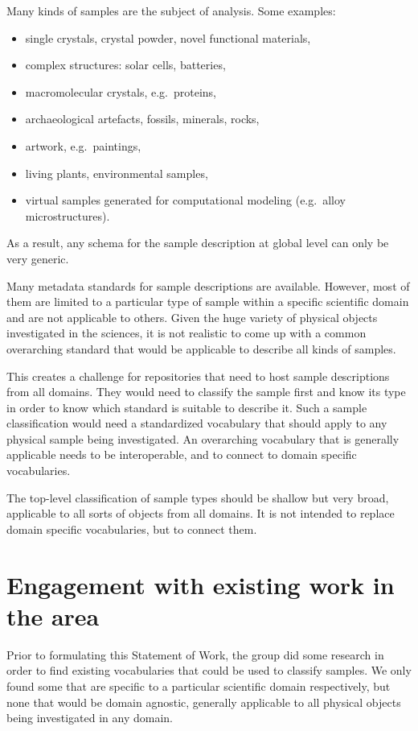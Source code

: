 \documentclass{scrartcl}
\begin{document}
Many kinds of samples are the subject of analysis. Some examples:
\begin{itemize}
\item single crystals, crystal powder, novel functional materials,
\item complex structures: solar cells, batteries,
\item macromolecular crystals, e.g.\ proteins,
\item archaeological artefacts, fossils, minerals, rocks,
\item artwork, e.g.\ paintings,
\item living plants, environmental samples,
\item virtual samples generated for computational modeling (e.g.\
  alloy microstructures).
\end{itemize}

As a result, any schema for the sample description at global level can
only be very generic.

Many metadata standards for sample descriptions are available.
However, most of them are limited to a particular type of sample
within a specific scientific domain and are not applicable to others.
Given the huge variety of physical objects investigated in the
sciences, it is not realistic to come up with a common overarching
standard that would be applicable to describe all kinds of samples.

This creates a challenge for repositories that need to host sample
descriptions from all domains.  They would need to classify the sample
first and know its type in order to know which standard is suitable to
describe it.  Such a sample classification would need a standardized
vocabulary that should apply to any physical sample being
investigated.  An overarching vocabulary that is generally applicable
needs to be interoperable, and to connect to domain specific
vocabularies.

The top-level classification of sample types should be shallow but
very broad, applicable to all sorts of objects from all domains.  It
is not intended to replace domain specific vocabularies, but to
connect them.

\section{Engagement with existing work in the area}

Prior to formulating this Statement of Work, the group did some
research in order to find existing vocabularies that could be used to
classify samples.  We only found some that are specific to a
particular scientific domain respectively, but none that would be
domain agnostic, generally applicable to all physical objects being
investigated in any domain.
\end{document}
